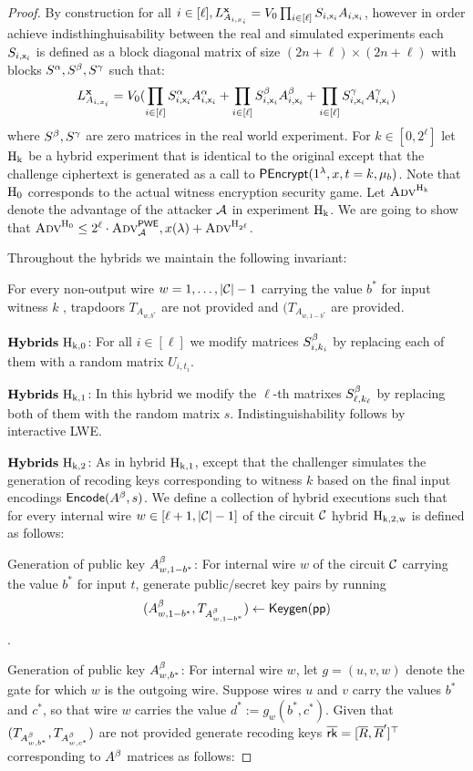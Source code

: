 \label{thm:main}
\ET
\begin{proof}
By construction for all $i\in [\ell], L_{A_{i,x_i}}^{\mathsf{{\bf x}}}=V_0\prod_{i\in[\ell]} S_{i,\mathsf{x}_i} A_{i,\mathsf{x}_i}$, however in order achieve indisthinghuisability between the real and simulated experiments each $S_{i,\mathsf{x}_i}$ is defined as a block diagonal matrix of size $(2n+\ell) \times (2n+\ell)$ with blocks $S^{\sc \alpha}, S^{\beta}, S^{\sc \gamma}$ such that: 
$$L_{A_{i,x_i}}^{\mathsf{{\bf x}}}=V_0(\prod_{i\in[\ell]} S^{\sc \alpha}_{i,\mathsf{x}_i} A^{\sc \alpha}_{i,\mathsf{x}_i}+\prod_{i\in[\ell]} S^{\beta}_{i,\mathsf{x}_i} A^{\beta}_{i,\mathsf{x}_i}+\prod_{i\in[\ell]} S^{\sc \gamma}_{i,\mathsf{x}_i} A^{\sc \gamma}_{i,\mathsf{x}_i})$$
where $S^{\beta}, S^{\sc \gamma}$ are zero matrices in the real world experiment. 
For $k \in [0, 2^\ell]$ let $\mathrm{\mathrm{H}_{k}}$ be a hybrid experiment that is identical to the original except that
the challenge ciphertext is generated as a call to ${\mathsf{PEncrypt}}(1^\lambda,x,t=k,\mu_b)$. Note that $\mathrm{\mathrm{H}_{0}}$
corresponds to the actual witness encryption security game. Let $\textsc{Adv}^{\mathrm{\mathrm{H}_{k}}}$ denote the advantage of
the attacker ${\cal A}$ in experiment $\mathrm{\mathrm{H}_{k}}$. We are going to show that $\textsc{Adv}^{\mathrm{\mathrm{H}_{0}}}\leq 2^\ell \cdot \textsc{Adv}^{\sf PWE}_{\cal A},x(\lambda)+ \textsc{Adv}^{\mathrm{\mathrm{H}_{2^\ell}}}$.

Throughout the hybrids we maintain the following invariant: 
\BI
\item For every non-output wire $w=1,\ldots,|{\cal C}|-1$ carrying the value $b^*$ for input witness $k$ , trapdoors $T_{A_{w,b^*}}$ are not provided and $(T_{A_{w,1-b^*}}$ are provided. 
\EI

\BE

\item[] ${\bf Hybrids}~ \mathrm{\mathrm{H}_{k,0}}$: For all $i\in[\ell]$ we modify matrices $S^{\beta}_{i,k_i}$ by replacing each of them with a random matrix $U_{i,t_i}$. 
\item[] ${\bf Hybrids}~ \mathrm{\mathrm{H}_{k,1}}$: In this hybrid we modify the $\ell$-th matrixes $S^{\beta}_{\ell,k_\ell}$ by replacing both of them with the random matrix $s$. Indistinguishability follows by interactive LWE. 

\item[] ${\bf Hybrids}~ \mathrm{\mathrm{H}_{k,2}}$: As in hybrid $ \mathrm{\mathrm{H}_{k,1}}$, except that the challenger simulates the generation of recoding keys corresponding to witness $k$ based on the final input encodings ${\mathsf{Encode}}(A^{\beta}, s)$. We define a collection of hybrid executions such that for every internal wire $w \in [\ell+ 1, |{\cal C}| -1]$ of the circuit ${\cal C}$ hybrid $\mathrm{\mathrm{H}_{k,2,w}}$ is defined as follows:
\BI
\item Generation of public key $A^{\beta}_{w,1-b^*}$: For internal wire $w$ of the circuit ${\cal C}$ carrying the value $b^*$ for input $t$, generate public/secret key pairs by running 
$$(A^{\beta}_{w,1-b^*}, T_{A^{\beta}_{w,1-b^*}})\leftarrow \mathsf{Keygen}({\mathsf{pp}})$$.
\item Generation of public key $A^{\beta}_{w,b^*}$: For internal wire $w$, let $g = (u, v, w)$ denote the gate for which $w$ is the outgoing
wire. Suppose wires $u$ and $v$ carry the values $b^*$ and $c^*$, so that wire $w$ carries the value
$d^*:= g_w(b^*, c^*)$. Given that $(T_{A^{\beta}_{w,b^*}},T_{A^{\beta}_{w,c^*}})$ are not provided generate recoding keys $\overline{{\mathsf{rk}}}=[\overline R, \overline R']^{\top}$ corresponding to $A^{\beta}$ matrices as follows: 




\end{proof}
